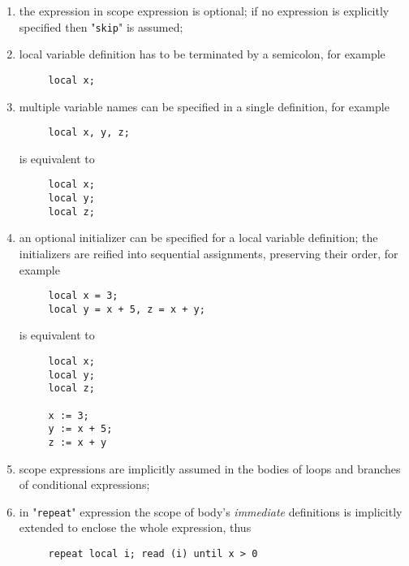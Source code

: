 \documentclass{article}
\theoremstyle{definition}
\begin{document}
\begin{enumerate}
\item the expression in scope expression is optional; if no expression is explicitly specified then "\lstinline|skip|" is assumed;
\item local variable definition has to be terminated by a semicolon, for example

  \begin{lstlisting}
     local x;
  \end{lstlisting}
  
\item multiple variable names can be specified in a single definition, for example

  \begin{lstlisting}
     local x, y, z;
  \end{lstlisting}

  is equivalent to
  
  \begin{lstlisting}
     local x;
     local y;
     local z;
  \end{lstlisting}

\item an optional initializer can be specified for a local variable definition; the initializers are reified into sequential assignments,
  preserving their order, for example

  \begin{lstlisting}
     local x = 3;
     local y = x + 5, z = x + y;
  \end{lstlisting}

  is equivalent to

  \begin{lstlisting}
     local x;
     local y;
     local z;

     x := 3;
     y := x + 5;
     z := x + y
  \end{lstlisting}

\item scope expressions are implicitly assumed in the bodies of loops and branches of conditional expressions;

\item in "\lstinline|repeat|" expression the scope of body's \emph{immediate} definitions is implicitly extended to enclose the
  whole expression, thus

  \begin{lstlisting}
     repeat local i; read (i) until x > 0
  \end{lstlisting}


\end{enumerate}
\end{document}
